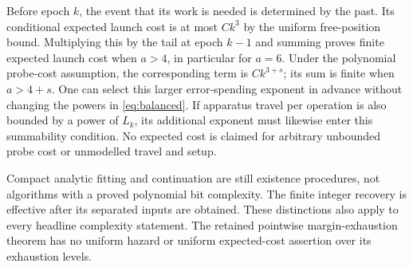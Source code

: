 Before epoch $k$, the event that its work is needed is determined by the
past. Its conditional expected launch cost is at most $Ck^3$ by the
uniform free-position bound. Multiplying this by the tail at epoch $k-1$
and summing proves finite expected launch cost when $a>4$, in particular
for $a=6$. Under the polynomial probe-cost assumption, the corresponding
term is $Ck^{3+s}$; its sum is finite when $a>4+s$. One can select this
larger error-spending exponent in advance without changing the powers
in \eqref{eq:balanced}. If apparatus travel per operation is also
bounded by a power of $L_k$, its additional exponent must likewise enter
this summability condition. No expected cost is claimed for arbitrary
unbounded probe cost or unmodelled travel and setup.

Compact analytic fitting and continuation are still existence procedures,
not algorithms with a proved polynomial bit complexity. The finite
integer recovery is effective after its separated inputs are obtained.
These distinctions also apply to every headline complexity statement.
The retained pointwise margin-exhaustion theorem has no uniform hazard
or uniform expected-cost assertion over its exhaustion levels.

